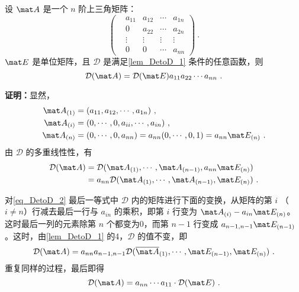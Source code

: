 \begin{lemma}{}\label{lem_DetoD_2}
设 $\mat A$ 是一个 $n$ 阶上三角矩阵：
\begin{equation}
\begin{pmatrix}
&a_{11}&a_{12}&\cdots&a_{1n}\\
&0&a_{22}&\cdots&a_{2n}\\
&\vdots&\vdots&\vdots&\vdots\\
&0&0&\cdots&a_{nn}
\end{pmatrix}~.
\end{equation}
$\mat E$ 是单位矩阵，且 $\mathcal D$ 是满足\autoref{lem_DetoD_1} 条件的任意函数，则
\begin{equation}
\mathcal D(\mat A)=\mathcal D(\mat E)a_{11}a_{22}\cdots a_{nn}~.
\end{equation}
\end{lemma}

\textbf{证明：}显然，
\begin{equation}
\begin{aligned}
\mat A_{(1)}&=(a_{11},a_{12},\cdots,a_{1n})~,\\
\mat A_{(i)}&=(0,\cdots,0,a_{ii},\cdots,a_{in})~,\\
\mat A_{(n)}&=(0,\cdots,0,a_{nn})=a_{nn}(0,\cdots,0,1)=a_{nn}\mat E_{(n)}~.
\end{aligned}
\end{equation}
由 $\mathcal D$ 的多重线性性，有
\begin{equation}\label{eq_DetoD_2}
\begin{aligned}
\mathcal D(\mat A)&=\mathcal D(\mat A_{(1)},\cdots,\mat A_{(n-1)},a_{nn}\mat E_{(n)})\\
&=a_{nn}\mathcal D(\mat A_{(1)},\cdots,\mat A_{(n-1)},\mat E_{(n)})~.
\end{aligned}
\end{equation}

对\autoref{eq_DetoD_2} 最后一等式中 $\mathcal D$ 内的矩阵进行下面的变换，从矩阵的第 $i$ （$i\neq n$）行减去最后一行与 $a_{in}$ 的乘积，即第 $i$ 行变为 $\mat A_{(i)}-a_{in}\mat E_{(n)}$。这时最后一列的元素除第 $n$ 个都变为0，而第 $n-1$ 行变成 $a_{n-1,n-1}\mat E_{(n-1)}$。这时，由\autoref{lem_DetoD_1} 的4，$\mathcal D$ 的值不变，即
\begin{equation}
\mathcal D(\mat A)=a_{nn}a_{n-1,n-1}\mathcal D(\overline{\mat A}_{(1)},\cdots,\mat E_{(n-1)},\mat E_{(n)})~.
\end{equation}
重复同样的过程，最后即得
\begin{equation}
\mathcal D(\mat A)=a_{nn}\cdots a_{11}\cdot \mathcal D(\mat E)~.
\end{equation}

